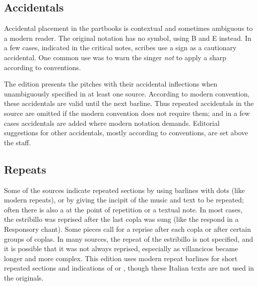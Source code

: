 \subsection{Accidentals}
Accidental placement in the partbooks is contextual and sometimes ambiguous to 
a modern reader.
The original notation has no \na{} symbol, using B\sh{} and E\sh{} instead.
In a few cases, indicated in the critical notes, scribes use a \sh{} sign as a 
cautionary accidental.
One common use was to warn the singer \emph{not} to apply a sharp according 
to  conventions.%
  \Autocites
  {Harran:Cautionary1}
  {Harran:Cautionary2}

The edition presents the pitches with their accidental inflections when 
unambiguously specified in at least one source.
According to modern convention, these accidentals are valid until the next 
barline.
Thus repeated accidentals in the source are omitted if the modern convention 
does not require them; and in a few cases accidentals are added where modern 
notation demands.
Editorial suggestions for other accidentals, mostly according to  conventions, are set above the staff.

\subsection{Repeats}
Some of the sources indicate repeated sections by using barlines with dots (like
modern repeats), or by giving the incipit of the music and text to be repeated;
often there is also a  at the point of repetition or a
textual note.
In most cases, the estribillo was reprised after the last copla was sung (like
the respond in a Responsory chant).
Some pieces call for a reprise after each copla or after certain groups of
coplas.
In many sources, the repeat of the estribillo is not specified, and it is
possible that it was not always reprised, especially as villancicos became
longer and more complex.%
    \Autocite{Torrente:Estribillo}
This edition uses modern repeat barlines for short repeated sections and
indications of  or , though these
Italian texts are not used in the originals.

